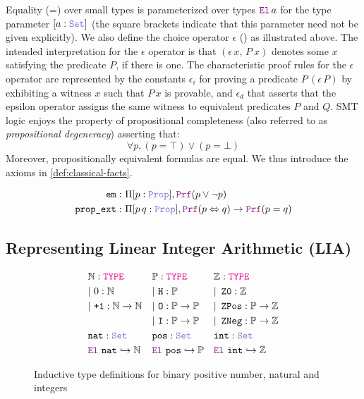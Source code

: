 Equality (=) over small types is parameterized over types
$\el\,a$ for the type parameter $[a : \set{}]$ (the square brackets indicate that this parameter need not be given explicitly).
We also define the choice operator $\epsilon$ (\cite[\S 2.1]{alethespec}) as illustrated above.
The intended interpretation for the $\epsilon$ operator is that $(\epsilon\,x,\, P~x)$ denotes some $x$ satisfying the predicate $P$, if there is one.
The characteristic proof rules for the $\epsilon$ operator are represented by
the constants $\epsilon_i$ for proving a predicate $P\,(\epsilon\,P)$ by exhibiting a witness $x$ such that $P\,x$ is provable,
and $\epsilon_d$ that asserts that the epsilon operator assigns the same witness to equivalent predicates $P$ and $Q$.
SMT logic enjoys the property of propositional completeness (also referred to as \emph{propositional degeneracy}) asserting that:
 \[
  \forall p,(p = \top) \lor (p = \bot) 
\]
Moreover, propositionally equivalent formulas are equal. We thus introduce the axioms in \cref{def:classical-facts}.

\begin{definition}
\begin{align*}
\texttt{em}:\ & \Pi [p: \prop], \prf (p \lor \neg p) \\
\texttt{prop\_ext}:\ & \Pi [p\,q: \prop], \prf (p \Leftrightarrow q ) \rightarrow \prf (p = q)
\end{align*}
\label{def:classical-facts}
\end{definition}

\subsection{Representing Linear Integer Arithmetic (\textbf{LIA})}
\label{ssec:encoding-lia}

\begin{figure}
\centering
\begin{align*}\label{eq:eq1}
&\N: \type & &\bb{P}: \type & &\Z: \type \\
&|~0: \N  & &|~\tt{H} : \bb{P} & &|~\ZO: \Z \\
&|~\tt{+1}:\N \ra \N & &|~\tt{O}: \bb{P} \ra \bb{P} & &|~\ZPos: \bb{P} \ra \Z \\
& & &|~\tt{I}: \bb{P} \ra \bb{P} & &|~\ZNeg: \bb{P} \ra \Z \\
&\tt{nat}: \set & &\tt{pos}: \set & &\tt{int}: \set \\
&\el~\tt{nat} \re \N & &\el~\tt{pos} \re \bb{P} & &\el~\tt{int} \re \Z 
\end{align*}
\caption{Inductive type definitions for binary positive number, natural and integers}
\label{fig:sorts-constructors}
\end{figure}

